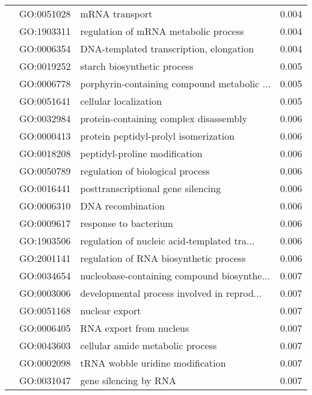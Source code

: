 \begin{longtable}{lllr}
   & GO:0051028 &                               mRNA transport &         0.004 \\
   & GO:1903311 &         regulation of mRNA metabolic process &         0.004 \\
   & GO:0006354 &      DNA-templated transcription, elongation &         0.004 \\
   & GO:0019252 &                  starch biosynthetic process &         0.005 \\
   & GO:0006778 &  porphyrin-containing compound metabolic ... &         0.005 \\
   & GO:0051641 &                        cellular localization &         0.005 \\
   & GO:0032984 &       protein-containing complex disassembly &         0.006 \\
   & GO:0000413 &        protein peptidyl-prolyl isomerization &         0.006 \\
   & GO:0018208 &                peptidyl-proline modification &         0.006 \\
   & GO:0050789 &             regulation of biological process &         0.006 \\
   & GO:0016441 &           posttranscriptional gene silencing &         0.006 \\
   & GO:0006310 &                            DNA recombination &         0.006 \\
   & GO:0009617 &                        response to bacterium &         0.006 \\
   & GO:1903506 &  regulation of nucleic acid-templated tra... &         0.006 \\
   & GO:2001141 &       regulation of RNA biosynthetic process &         0.006 \\
   & GO:0034654 &  nucleobase-containing compound biosynthe... &         0.007 \\
   & GO:0003006 &  developmental process involved in reprod... &         0.007 \\
   & GO:0051168 &                               nuclear export &         0.007 \\
   & GO:0006405 &                      RNA export from nucleus &         0.007 \\
   & GO:0043603 &             cellular amide metabolic process &         0.007 \\
   & GO:0002098 &             tRNA wobble uridine modification &         0.007 \\
   & GO:0031047 &                        gene silencing by RNA &         0.007 \\

\end{longtable}
